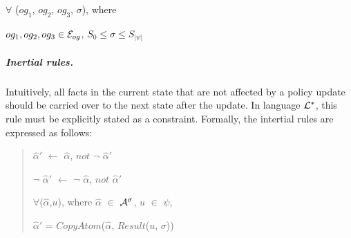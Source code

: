 \documentclass[10pt, twocolumn]{article}
\begin{document}
\begin{enumerate}
                $\forall$ ($og_{1}$, $og_{2}$, $og_{3}$, $\sigma$), where

                $og_{1}, og_{2}, og_{3} \in {\cal E}_{og}$,
                $S_{0} \leq \sigma \leq S_{|\psi|}$
            \end{enumerate}

          \subparagraph{Inertial rules.}

            Intuitively, all facts in the current state that are not affected
            by a policy update should be carried over to the next state after
            the update. In language ${\cal L}^{*}$, this rule must be
            explicitly stated as a constraint. Formally, the intertial rules
            are expressed as follows:

            \begin{quote}
              $\hat{\alpha}'$ $\leftarrow$ $\hat{\alpha}$, $not$ $\lnot$ $\hat{\alpha}'$

              $\lnot$ $\hat{\alpha}'$ $\leftarrow$ $\lnot$ $\hat{\alpha}$, $not$ $\hat{\alpha}'$

              $\forall$($\hat{\alpha}$,$u$), where
              $\hat{\alpha}$ $\in$ ${\cal A}^{\sigma}$,
              $u$ $\in$ $\psi$,

              $\hat{\alpha}'$ = $CopyAtom$($\hat{\alpha}$, $Result$($u$, $\sigma$))
            \end{quote}
\end{document}

